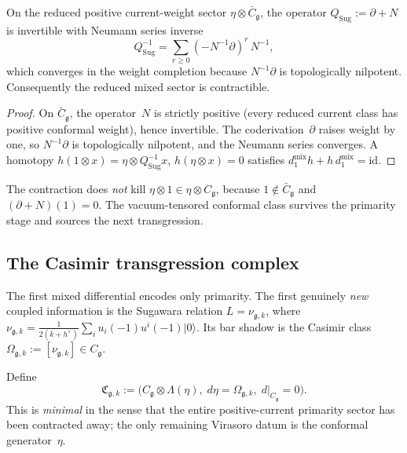 \begin{proposition}
\label{prop:sugawara-contraction}
On the reduced positive current-weight sector
$\eta \otimes \bar{C}_\mathfrak{g}$, the operator
$Q_{\mathrm{Sug}} := \partial + N$ is invertible with Neumann
series inverse
\[
Q_{\mathrm{Sug}}^{-1}
= \sum_{r \geq 0} (-N^{-1}\partial)^r \, N^{-1},
\]
which converges in the weight completion because $N^{-1}\partial$
is topologically nilpotent. Consequently the reduced mixed sector
is contractible.
\end{proposition}

\begin{proof}
On $\bar{C}_\mathfrak{g}$, the operator~$N$ is strictly positive
(every reduced current class has positive conformal weight), hence
invertible. The coderivation~$\partial$ raises weight by one, so
$N^{-1}\partial$ is topologically nilpotent, and the Neumann series
converges. A homotopy
$h(1 \otimes x) = \eta \otimes Q_{\mathrm{Sug}}^{-1} x$,
$h(\eta \otimes x) = 0$
satisfies $d_1^{\mathrm{mix}} h + h\, d_1^{\mathrm{mix}} = \mathrm{id}$.
\end{proof}

\begin{remark}
\label{rem:surviving-conformal-class}
The contraction does \emph{not} kill
$\eta \otimes 1 \in \eta \otimes C_\mathfrak{g}$,
because $1 \notin \bar{C}_\mathfrak{g}$ and
$(\partial + N)(1) = 0$.
The vacuum-tensored conformal class survives the primarity stage
and sources the next transgression.
\end{remark}

\subsection{The Casimir transgression complex}
\label{subsec:casimir-transgression-complex}

The first mixed differential encodes only primarity. The first
genuinely \emph{new} coupled information is the Sugawara relation
$L = \nu_{\mathfrak{g},k}$, where
$\nu_{\mathfrak{g},k}
= \tfrac{1}{2(k+h^\vee)} \sum_i u_i(-1) u^i(-1)\lvert 0\rangle$.
Its bar shadow is the Casimir class
$\Omega_{\mathfrak{g},k}
:= [\nu_{\mathfrak{g},k}] \in C_\mathfrak{g}$.

\begin{construction}
\label{cons:minimal-casimir-transgression}
Define
\[
\mathfrak{C}_{\mathfrak{g},k}
:= \bigl(C_\mathfrak{g} \otimes \Lambda(\eta),\;
 d\eta = \Omega_{\mathfrak{g},k},\;
 d|_{C_\mathfrak{g}} = 0\bigr).
\]
This is \emph{minimal} in the sense that the entire
positive-current primarity sector has been contracted away; the
only remaining Virasoro datum is the conformal generator~$\eta$.
\end{construction}

